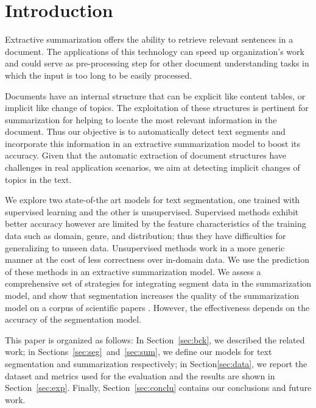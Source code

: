 \documentclass[sigconf]{acmart}
\begin{document}
\maketitle

\section{Introduction}
Extractive summarization offers the ability to retrieve relevant sentences in a document. The applications of this technology can speed up organization's work and could serve as pre-processing step for other document understanding tasks in which the input is too long to be easily processed. 

Documents have an internal structure that can be explicit like content tables, or implicit like change of topics. The exploitation of these structures is pertinent for summarization for helping to locate the most relevant information in the document. Thus our objective is to automatically detect text segments and incorporate this information in an extractive summarization model to boost its accuracy. Given that the automatic extraction of document structures have challenges in real application scenarios, we aim at detecting implicit changes of topics in the text. 


We explore two state-of-the art models for text segmentation, one trained with supervised learning and the other is unsupervised. Supervised methods exhibit better accuracy however are limited by the feature characteristics of the training data such as domain, genre, and distribution; thus they have difficulties for generalizing to unseen data. Unsupervised methods work in a more generic manner at the cost of less correctness over in-domain data. We use the prediction of these methods in an extractive summarization model. We assess a comprehensive set of strategies for integrating segment data in the summarization model, and show that segmentation increases the quality of the summarization model on a corpus of scientific papers \cite{cohan-etal-2018-discourse}. However, the effectiveness depends on the accuracy of the segmentation model. 

This paper is organized as follows: In Section~\ref{sec:bck}, we described the related work; in Sections~\ref{sec:seg}~and~\ref{sec:sum}, we define our models for text segmentation and summarization respectively; in Section\ref{sec:data}, we report the dataset and metrics used for the evaluation and the results are shown in Section~\ref{sec:exp}. Finally, Section~\ref{sec:conclu} contains our conclusions and future work.
\end{document}
